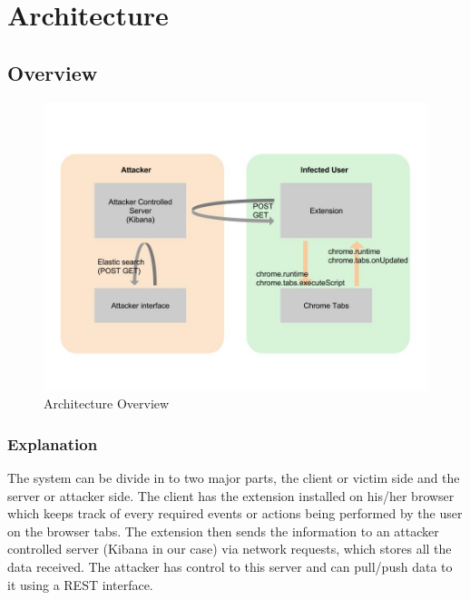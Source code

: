 \chapter{Architecture}

\section{Overview}
\begin{figure}[h!]
	\centering\includegraphics[width=\textwidth,height=\textheight,keepaspectratio]{architecture1.jpg}
	\caption{Architecture Overview}
	\label{fig:1}
\end{figure}

\subsection{Explanation} 
The system can be divide in to two major parts, the client or victim side and the server or attacker side. The client has the extension installed on his/her browser which keeps track of every required events or actions being performed by the user on the browser tabs. The extension then sends the information to an attacker controlled server (Kibana in our case) via network requests, which stores all the data received. The attacker has control to this server and can pull/push data to it using a REST interface.

